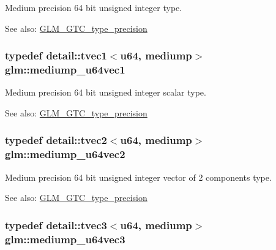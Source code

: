 Medium precision 64 bit unsigned integer type. \begin{Desc}
\item[See also:]\hyperlink{group__gtc__type__precision}{GLM\_\-GTC\_\-type\_\-precision} \end{Desc}
\hypertarget{group__gtc__type__precision_gf4211dc9e211d57b34b45a612b6de193}{
\subsubsection[mediump\_\-u64vec1]{\setlength{\rightskip}{0pt plus 5cm}typedef detail::tvec1$<$u64, mediump$>$ {\bf glm::mediump\_\-u64vec1}}}
\label{group__gtc__type__precision_gf4211dc9e211d57b34b45a612b6de193}


Medium precision 64 bit unsigned integer scalar type. \begin{Desc}
\item[See also:]\hyperlink{group__gtc__type__precision}{GLM\_\-GTC\_\-type\_\-precision} \end{Desc}
\hypertarget{group__gtc__type__precision_g9eda8d6f5be7a2919fb90412535b385f}{
\subsubsection[mediump\_\-u64vec2]{\setlength{\rightskip}{0pt plus 5cm}typedef detail::tvec2$<$u64, mediump$>$ {\bf glm::mediump\_\-u64vec2}}}
\label{group__gtc__type__precision_g9eda8d6f5be7a2919fb90412535b385f}


Medium precision 64 bit unsigned integer vector of 2 components type. \begin{Desc}
\item[See also:]\hyperlink{group__gtc__type__precision}{GLM\_\-GTC\_\-type\_\-precision} \end{Desc}
\hypertarget{group__gtc__type__precision_g7af0601e6a8ce71bd21ecf67971f5154}{
\subsubsection[mediump\_\-u64vec3]{\setlength{\rightskip}{0pt plus 5cm}typedef detail::tvec3$<$u64, mediump$>$ {\bf glm::mediump\_\-u64vec3}}}
\label{group__gtc__type__precision_g7af0601e6a8ce71bd21ecf67971f5154}


